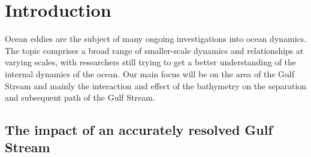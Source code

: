 \documentclass[..\EOYR.tex]{subfiles}
\begin{document}
\section{Introduction}
\label{SEC:Introduction}

Ocean eddies are the subject of many ongoing investigations into ocean dynamics. The topic comprises a broad range of smaller-scale dynamics and relationships at varying scales,
with researchers still trying to get a better understanding of the internal dynamics of the ocean. Our main focus will be on the area of the Gulf Stream and mainly the interaction and effect of the bathymetry on the separation and subsequent path of the Gulf Stream.

\subsection{The impact of an accurately resolved Gulf Stream}
\label{SSEC:AccuratelyResolvedGS}
\end{document}
